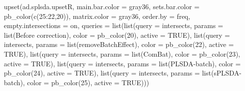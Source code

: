 \documentclass[
]{book}
\newenvironment{Shaded}{\begin{snugshade}}{\end{snugshade}}
\newcommand{\AttributeTok}[1]{\textcolor[rgb]{0.77,0.63,0.00}{#1}}
\newcommand{\ConstantTok}[1]{\textcolor[rgb]{0.00,0.00,0.00}{#1}}
\newcommand{\DecValTok}[1]{\textcolor[rgb]{0.00,0.00,0.81}{#1}}
\newcommand{\FunctionTok}[1]{\textcolor[rgb]{0.00,0.00,0.00}{#1}}
\newcommand{\NormalTok}[1]{#1}
\newcommand{\SpecialCharTok}[1]{\textcolor[rgb]{0.00,0.00,0.00}{#1}}
\newcommand{\StringTok}[1]{\textcolor[rgb]{0.31,0.60,0.02}{#1}}
\begin{document}
\begin{Shaded}
\begin{Highlighting}[]
\FunctionTok{upset}\NormalTok{(ad.splsda.upsetR, }\AttributeTok{main.bar.color =} \StringTok{\textquotesingle{}gray36\textquotesingle{}}\NormalTok{,}
      \AttributeTok{sets.bar.color =} \FunctionTok{pb\_color}\NormalTok{(}\FunctionTok{c}\NormalTok{(}\DecValTok{25}\SpecialCharTok{:}\DecValTok{22}\NormalTok{,}\DecValTok{20}\NormalTok{)), }\AttributeTok{matrix.color =} \StringTok{\textquotesingle{}gray36\textquotesingle{}}\NormalTok{,}
      \AttributeTok{order.by =} \StringTok{\textquotesingle{}freq\textquotesingle{}}\NormalTok{, }\AttributeTok{empty.intersections =} \StringTok{\textquotesingle{}on\textquotesingle{}}\NormalTok{,}
      \AttributeTok{queries =} \FunctionTok{list}\NormalTok{(}\FunctionTok{list}\NormalTok{(}\AttributeTok{query =}\NormalTok{ intersects, }
                          \AttributeTok{params =} \FunctionTok{list}\NormalTok{(}\StringTok{\textquotesingle{}Before correction\textquotesingle{}}\NormalTok{), }
                          \AttributeTok{color =} \FunctionTok{pb\_color}\NormalTok{(}\DecValTok{20}\NormalTok{), }\AttributeTok{active =} \ConstantTok{TRUE}\NormalTok{),}
                     \FunctionTok{list}\NormalTok{(}\AttributeTok{query =}\NormalTok{ intersects, }
                          \AttributeTok{params =} \FunctionTok{list}\NormalTok{(}\StringTok{\textquotesingle{}removeBatchEffect\textquotesingle{}}\NormalTok{), }
                          \AttributeTok{color =} \FunctionTok{pb\_color}\NormalTok{(}\DecValTok{22}\NormalTok{), }\AttributeTok{active =} \ConstantTok{TRUE}\NormalTok{),}
                     \FunctionTok{list}\NormalTok{(}\AttributeTok{query =}\NormalTok{ intersects, }
                          \AttributeTok{params =} \FunctionTok{list}\NormalTok{(}\StringTok{\textquotesingle{}ComBat\textquotesingle{}}\NormalTok{), }
                          \AttributeTok{color =} \FunctionTok{pb\_color}\NormalTok{(}\DecValTok{23}\NormalTok{), }\AttributeTok{active =} \ConstantTok{TRUE}\NormalTok{),}
                     \FunctionTok{list}\NormalTok{(}\AttributeTok{query =}\NormalTok{ intersects, }
                          \AttributeTok{params =} \FunctionTok{list}\NormalTok{(}\StringTok{\textquotesingle{}PLSDA{-}batch\textquotesingle{}}\NormalTok{), }
                          \AttributeTok{color =} \FunctionTok{pb\_color}\NormalTok{(}\DecValTok{24}\NormalTok{), }\AttributeTok{active =} \ConstantTok{TRUE}\NormalTok{),}
                     \FunctionTok{list}\NormalTok{(}\AttributeTok{query =}\NormalTok{ intersects, }
                          \AttributeTok{params =} \FunctionTok{list}\NormalTok{(}\StringTok{\textquotesingle{}sPLSDA{-}batch\textquotesingle{}}\NormalTok{), }
                          \AttributeTok{color =} \FunctionTok{pb\_color}\NormalTok{(}\DecValTok{25}\NormalTok{), }\AttributeTok{active =} \ConstantTok{TRUE}\NormalTok{)))}
\end{Highlighting}
\end{Shaded}
\end{document}
